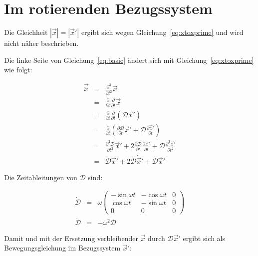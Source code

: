 \documentclass[12pt]{article}
\begin{document}
\section{Im rotierenden Bezugssystem}

Die Gleichheit $\left| \vec{x} \right| = \left| \vec{x}' \right|$ ergibt sich wegen Gleichung~\ref{eq:xtoxprime} und wird nicht näher beschrieben.

Die linke Seite von Gleichung~\ref{eq:basic} ändert sich mit Gleichung~\ref{eq:xtoxprime} wie folgt:

\begin{eqnarray}
\vec{\ddot{x}}
  &=& \frac{\partial^2}{\partial t^2} \vec{x} \nonumber \\
  &=& \frac{\partial}{\partial t} \frac{\partial}{\partial t} \vec{x} \nonumber \\
  &=& \frac{\partial}{\partial t} \frac{\partial}{\partial t} \left( \mathcal{D} \vec{x}' \right) \nonumber \\
  &=& \frac{\partial}{\partial t} \left( \frac{\partial\mathcal{D}}{\partial t} \vec{x}' + \mathcal{D} \frac{\partial\vec{x}'}{\partial t} \right) \nonumber \\
  &=& \frac{\partial^2\mathcal{D}}{\partial t^2} \vec{x}'
     + 2 \frac{\partial\mathcal{D}}{\partial t} \frac{\partial\vec{x}'}{\partial t}
     + \mathcal{D} \frac{\partial^2\vec{x}'}{\partial t^2} \nonumber \\
  &=& \ddot{\mathcal{D}}\vec{x}' + 2 \dot{\mathcal{D}}\dot{\vec{x}}' + \mathcal{D}\ddot{\vec{x}}' \nonumber 
\end{eqnarray}

Die Zeitableitungen von $\mathcal{D}$ sind:

\begin{eqnarray}
\dot{\mathcal{D}} &=& \omega \left(
\begin{matrix}
 -\sin \omega t & -\cos \omega t & 0 \\
  \cos \omega t & -\sin \omega t & 0 \\
  0             &  0             & 0
\end{matrix}
\right) \nonumber \\
\ddot{\mathcal{D}} &=& -\omega^2 \mathcal{D} \nonumber 
\end{eqnarray}

Damit und mit der Ersetzung verbleibender $\vec{x}$ durch $\mathcal{D}\vec{x}'$ ergibt sich als Bewegungsgleichung im Bezugssystem $\vec{x}'$:
\end{document}
